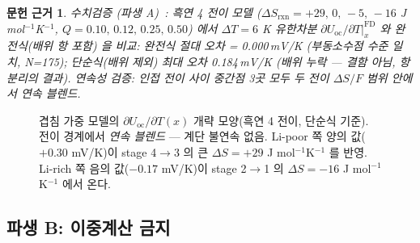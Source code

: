 \documentclass[11pt,a4paper]{article}
\newtheorem*{srcbox}{문헌 근거}
\newcommand{\rxn}{\mathrm{rxn}}
\newcommand{\oc}{\mathrm{oc}}
\begin{document}
\begin{srcbox}
수치검증 (파생 A)~\cite{verif42}: 흑연 4 전이 모델
($\Delta S_\rxn=+29,\,0,\,-5,\,-16$ J\,mol$^{-1}$K$^{-1}$, $Q=0.10,\,0.12,\,0.25,\,0.50$)
에서 $\Delta T=6$ K 유한차분 $\partial U_\oc/\partial T|_x^{\mathrm{FD}}$ 와
완전식(배위 항 포함) 을 비교:
완전식 절대 오차 = 0.000\,mV/K (부동소수점 수준 일치, N=175);
단순식(배위 제외) 최대 오차 0.184\,mV/K (배위 누락 — 결함 아님, 항 분리의 결과).
연속성 검증: 인접 전이 사이 중간점 3곳 모두 두 전이 $\Delta S/F$ 범위 안에서 연속 블렌드.
\end{srcbox}

\begin{figure}[h]
\centering
{}
\caption{겹침 가중 모델의 $\partial U_\oc/\partial T(x)$ 개략 모양(흑연 4 전이, 단순식 기준).
  전이 경계에서 \emph{연속 블렌드} --- 계단 불연속 없음.
  Li-poor 쪽 양의 값($+0.30$ mV/K)이 stage 4$\to$3 의 큰 $\Delta S=+29$ J mol$^{-1}$K$^{-1}$ 를 반영.
  Li-rich 쪽 음의 값($-0.17$ mV/K)이 stage 2$\to$1 의 $\Delta S=-16$ J mol$^{-1}$K$^{-1}$ 에서 온다.}
\label{fig:dUdT_blend}
\end{figure}

\subsection{파생 B: 이중계산 금지}\label{sec:double_count}
\end{document}
